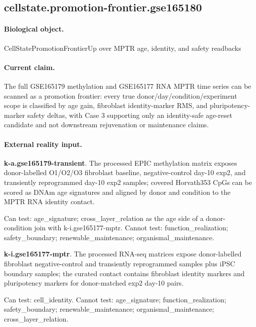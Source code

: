 \subsection{cellstate.promotion-frontier.gse165180}

\paragraph{Biological object.} CellStatePromotionFrontierUp over MPTR age, identity, and safety readbacks

\paragraph{Current claim.} The full GSE165179 methylation and GSE165177 RNA MPTR time series can be scanned as a promotion frontier: every true donor/day/condition/experiment scope is classified by age gain, fibroblast identity-marker RMS, and pluripotency-marker safety deltas, with Case 3 supporting only an identity-safe age-reset candidate and not downstream rejuvenation or maintenance claims.

\paragraph{External reality input.}
\textbf{k-a.gse165179-transient}. The processed EPIC methylation matrix exposes donor-labelled O1/O2/O3 fibroblast baseline, negative-control day-10 exp2, and transiently reprogrammed day-10 exp2 samples; covered Horvath353 CpGs can be scored as DNAm age signatures and aligned by donor and condition to the MPTR RNA identity contact.

Can test: age\_signature; cross\_layer\_relation as the age side of a donor-condition join with k-i.gse165177-mptr. Cannot test: function\_realization; safety\_boundary; renewable\_maintenance; organismal\_maintenance.

\textbf{k-i.gse165177-mptr}. The processed RNA-seq matrices expose donor-labelled fibroblast negative-control and transiently reprogrammed samples plus iPSC boundary samples; the curated contact contains fibroblast identity markers and pluripotency markers for donor-matched exp2 day-10 pairs.

Can test: cell\_identity. Cannot test: age\_signature; function\_realization; safety\_boundary; renewable\_maintenance; organismal\_maintenance; cross\_layer\_relation.

